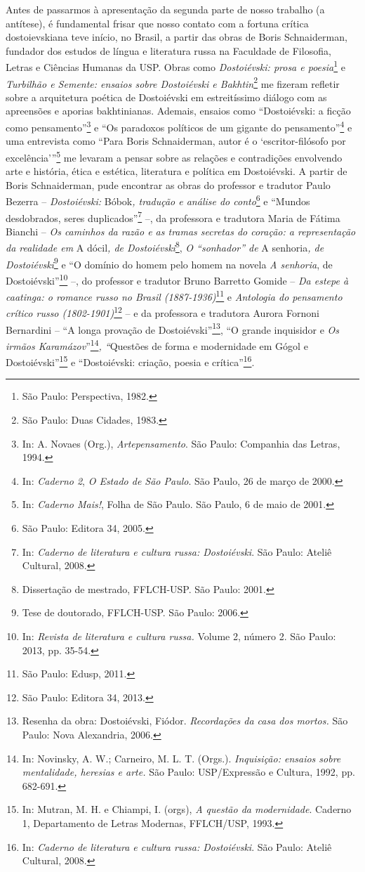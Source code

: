 Antes de passarmos à apresentação da segunda parte de nosso trabalho (a
antítese), é fundamental frisar que nosso contato com a fortuna crítica
dostoievskiana teve início, no Brasil, a partir das obras de Boris
Schnaiderman, fundador dos estudos de língua e literatura russa na
Faculdade de Filosofia, Letras e Ciências Humanas da USP. Obras como
\emph{Dostoiévski: prosa e poesia}\footnote{São Paulo: Perspectiva,
  1982.} e \emph{Turbilhão e Semente: ensaios sobre Dostoiévski e
Bakhtin}\footnote{São Paulo: Duas Cidades, 1983.} me fizeram refletir
sobre a arquitetura poética de Dostoiévski em estreitíssimo diálogo com
as apreensões e aporias bakhtinianas. Ademais, ensaios como
``Dostoiévski: a ficção como pensamento''\footnote{In: A. Novaes (Org.),
  \emph{Artepensamento}. São Paulo: Companhia das Letras, 1994.} e ``Os
paradoxos políticos de um gigante do pensamento''\footnote{In:
  \emph{Caderno 2}, \emph{O Estado de São Paulo}. São Paulo, 26 de março
  de 2000.} e uma entrevista como ``Para Boris Schnaiderman, autor é o
`escritor-filósofo por excelência'''\footnote{In: \emph{Caderno Mais!},
  Folha de São Paulo. São Paulo, 6 de maio de 2001.} me levaram a pensar
sobre as relações e contradições envolvendo arte e história, ética e
estética, literatura e política em Dostoiévski. A partir de Boris
Schnaiderman, pude encontrar as obras do professor e tradutor Paulo
Bezerra -- \emph{Dostoiévski:} Bóbok\emph{, tradução e análise do
conto}\footnote{São Paulo: Editora 34, 2005.} e ``Mundos desdobrados,
seres duplicados''\footnote{In: \emph{Caderno de literatura e cultura
  russa: Dostoiévski}. São Paulo: Ateliê Cultural, 2008.} --, da
professora e tradutora Maria de Fátima Bianchi -- \emph{Os caminhos da
razão e as tramas secretas do coração: a representação da realidade em}
A dócil\emph{, de Dostoiévski}\footnote{Dissertação de mestrado,
  FFLCH-USP. São Paulo: 2001.}, \emph{O ``sonhador'' de} A
senhoria\emph{, de Dostoiévski}\footnote{Tese de doutorado, FFLCH-USP.
  São Paulo: 2006.} e ``O domínio do homem pelo homem na novela \emph{A
senhoria}, de Dostoiévski''\footnote{In: \emph{Revista de literatura e
  cultura russa.} Volume 2, número 2. São Paulo: 2013, pp. 35-54.} --,
do professor e tradutor Bruno Barretto Gomide -- \emph{Da estepe à
caatinga: o romance russo no Brasil (1887-1936)}\footnote{São Paulo:
  Edusp, 2011.} e \emph{Antologia do pensamento crítico russo
(1802-1901)}\footnote{São Paulo: Editora 34, 2013.} -- e da professora e
tradutora Aurora Fornoni Bernardini -- ``A longa provação de
Dostoiévski''\footnote{Resenha da obra: Dostoiévski, Fiódor.
  \emph{Recordações da casa dos mortos.} São Paulo: Nova Alexandria,
  2006.}, ``O grande inquisidor e \emph{Os irmãos Karamázov}''\footnote{In:
  Novinsky, A. W.; Carneiro, M. L. T. (Orgs.). \emph{Inquisição: ensaios
  sobre mentalidade, heresias e arte.} São Paulo: USP/Expressão e
  Cultura, 1992, pp. 682-691.}\emph{, ``}Questões de forma e modernidade
em Gógol e Dostoiévski''\footnote{In: Mutran, M. H. e Chiampi, I.
  (orgs), \emph{A questão da modernidade}. Caderno 1, Departamento de
  Letras Modernas, FFLCH/USP, 1993.} e ``Dostoiévski: criação, poesia e
crítica''\footnote{In: \emph{Caderno de literatura e cultura russa:
  Dostoiévski}. São Paulo: Ateliê Cultural, 2008.}.

